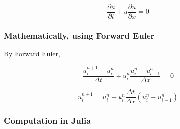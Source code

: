 \documentclass[11pt]{article}
\begin{document}
$$\frac{\partial u}{\partial t} + u \frac{\partial u}{\partial x} =
0$$

\subsubsection{Mathematically, using Forward Euler}
\label{sec:orga23cd47}

By Forward Euler,

$$\frac{u_i^{n+1}-u_i^n}{\Delta t} + u_i^n \frac{u_i^n-u_{i-1}^n}{\Delta x} = 0$$

$$u_i^{n+1} = u_i^n - u_i^n \frac{\Delta t}{\Delta x} (u_i^n - u_{i-1}^n)$$

\subsubsection{Computation in Julia}
\label{sec:org0af2d91}
\end{document}
